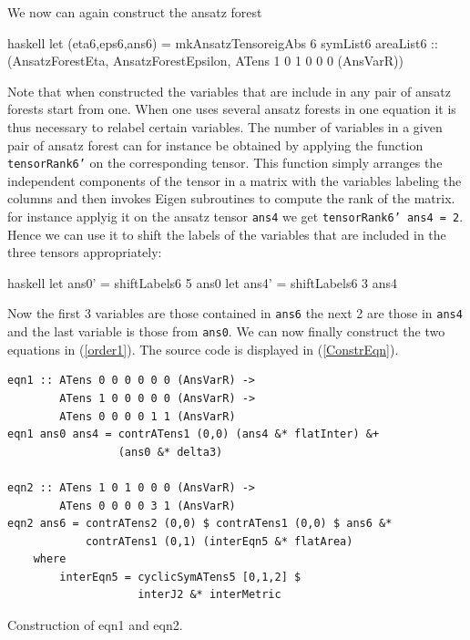 \documentclass[a4paper,12pt, DIV=14, BCOR=5mm, twoside, headsepline, numbers=noenddot]{scrbook}
\begin{document}
We now can again construct the ansatz forest 

\begin{center}
\begin{cminted}{haskell}
let (eta6,eps6,ans6) = mkAnsatzTensoreigAbs 6 symList6 areaList6 :: 
                       (AnsatzForestEta, AnsatzForestEpsilon,
                       ATens 1 0 1 0 0 0 (AnsVarR))
\end{cminted}
\end{center}

Note that when constructed the variables that are include in any pair of ansatz forests start from one. When one uses several ansatz forests in one equation it is thus necessary to relabel certain variables. The number of variables in a given pair of ansatz forest can for instance be obtained by applying the function \texttt{tensorRank6'} on the corresponding tensor. This function simply arranges the independent components of the tensor in a matrix with the variables labeling the columns and then invokes Eigen subroutines to compute the rank of the matrix. for instance applyig it on the ansatz tensor \texttt{ans4} we get \texttt{tensorRank6' ans4 = 2}. Hence we can use it to shift the labels of the variables that are included in the three tensors appropriately:

\begin{center}
\begin{cminted}{haskell}
let ans0' = shiftLabels6 5 ans0
let ans4' = shiftLabels6 3 ans4 
\end{cminted}
\end{center}

Now the first 3 variables are those contained in \texttt{ans6} the next 2 are those in \texttt{ans4} and the last variable is those from \texttt{ans0}.
We can now finally construct the two equations in (\ref{order1}). The source code is displayed in (\ref{ConstrEqn}).

\begin{listing}[hbt!]
\begin{verbatim}
eqn1 :: ATens 0 0 0 0 0 0 (AnsVarR) ->
        ATens 1 0 0 0 0 0 (AnsVarR) ->
        ATens 0 0 0 0 1 1 (AnsVarR)
eqn1 ans0 ans4 = contrATens1 (0,0) (ans4 &* flatInter) &+
                 (ans0 &* delta3)
                 
eqn2 :: ATens 1 0 1 0 0 0 (AnsVarR) ->
        ATens 0 0 0 0 3 1 (AnsVarR)
eqn2 ans6 = contrATens2 (0,0) $ contrATens1 (0,0) $ ans6 &*
            contrATens1 (0,1) (interEqn5 &* flatArea)
    where 
        interEqn5 = cyclicSymATens5 [0,1,2] $
                    interJ2 &* interMetric
\end{verbatim} 
\caption{Construction of eqn1 and eqn2.}\label{ConstrEqn}
\end{listing}
\end{document}
